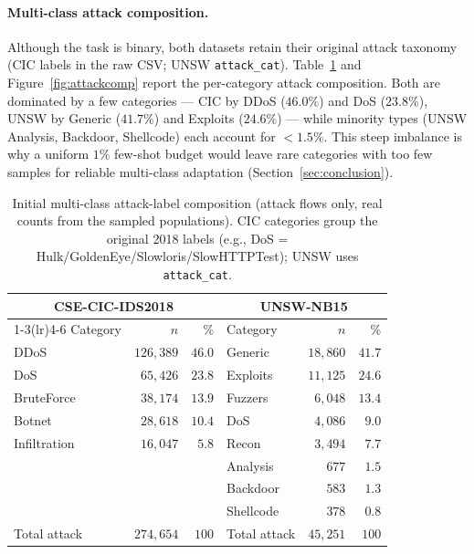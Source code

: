 \documentclass[preprint,12pt,authoryear]{elsarticle}
\begin{document}
\paragraph{Multi-class attack composition.} Although the task is binary, both
datasets retain their original attack taxonomy (CIC labels in the raw CSV; UNSW
\texttt{attack\_cat}). Table~\ref{tab:attackcomp} and Figure~\ref{fig:attackcomp}
report the per-category attack composition. Both are dominated by a few categories
--- CIC by DDoS ($46.0\%$) and DoS ($23.8\%$), UNSW by Generic ($41.7\%$) and
Exploits ($24.6\%$) --- while minority types (UNSW Analysis, Backdoor, Shellcode)
each account for $<1.5\%$. This steep imbalance is why a uniform $1\%$ few-shot
budget would leave rare categories with too few samples for reliable multi-class
adaptation (Section~\ref{sec:conclusion}).

\begin{table}[h]
\centering
\caption{Initial multi-class attack-label composition (attack flows only, real
counts from the sampled populations). CIC categories group the original 2018 labels
(e.g., DoS = Hulk/GoldenEye/Slowloris/SlowHTTPTest); UNSW uses \texttt{attack\_cat}.}
\label{tab:attackcomp}
\small
\begin{tabular}{lr r @{\hskip 2em} lr r}
\toprule
\multicolumn{3}{c}{CSE-CIC-IDS2018} & \multicolumn{3}{c}{UNSW-NB15} \\
\cmidrule(lr){1-3}\cmidrule(lr){4-6}
Category & $n$ & \% & Category & $n$ & \% \\
\midrule
DDoS         & $126{,}389$ & $46.0$ & Generic   & $18{,}860$ & $41.7$ \\
DoS          & $65{,}426$  & $23.8$ & Exploits  & $11{,}125$ & $24.6$ \\
BruteForce   & $38{,}174$  & $13.9$ & Fuzzers   & $6{,}048$  & $13.4$ \\
Botnet       & $28{,}618$  & $10.4$ & DoS       & $4{,}086$  & $9.0$  \\
Infiltration & $16{,}047$  & $5.8$  & Recon     & $3{,}494$  & $7.7$  \\
             &             &        & Analysis  & $677$      & $1.5$  \\
             &             &        & Backdoor  & $583$      & $1.3$  \\
             &             &        & Shellcode & $378$      & $0.8$  \\
\midrule
Total attack & $274{,}654$ & $100$ & Total attack & $45{,}251$ & $100$ \\
\bottomrule
\end{tabular}
\end{table}
\end{document}
